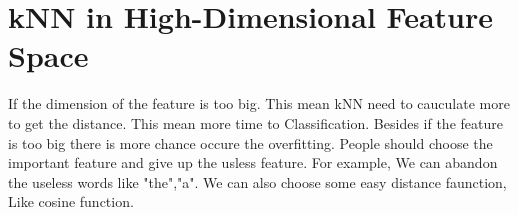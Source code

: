 \documentclass{article}
\begin{document}
\section{kNN in High-Dimensional Feature Space}
If the dimension of the feature is too big. This mean kNN need to cauculate more to get the distance. This mean more time to Classification. Besides if the feature is too big there is more chance occure the overfitting. People should choose the important feature and give up the usless feature. For example, We can abandon the useless words like "the","a".
We can also choose some easy distance faunction, Like cosine function. 
\end{document}
